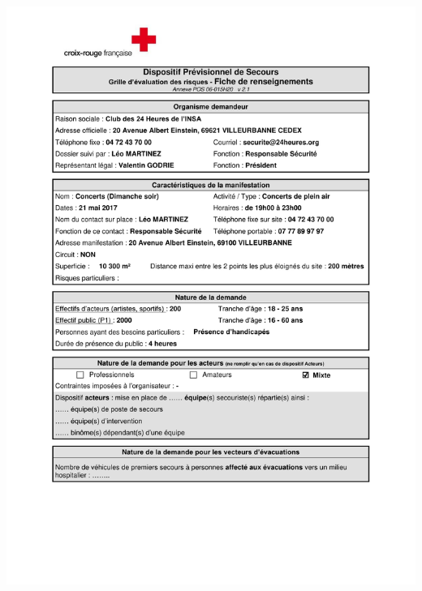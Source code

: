 \documentclass[hidelinks, paper=a4, fontsize=13pt]{report}
\begin{document}
\begin{center}
	\includegraphics[scale=0.70, page=2]{Annexes/Documents/Fiche_RIS_Concerts_Dim_2017}
\end{center}
\end{document}

